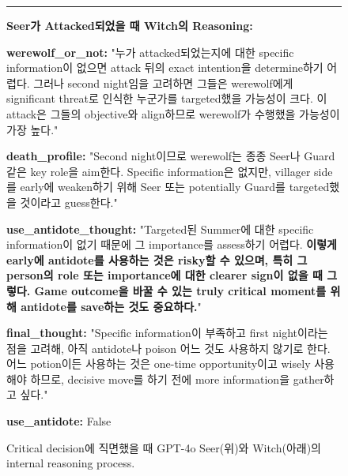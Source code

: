 \begin{figure}[htbp]
\begin{tcolorbox}[colback=blue!2!white, colframe=gray!50!blue]
\begin{minipage}{\linewidth}
\par\noindent\rule{\linewidth}{0.4pt}

\textbf{Seer가 Attacked되었을 때 Witch의 Reasoning:}

\textbf{werewolf\_or\_not:}
"누가 attacked되었는지에 대한 specific information이 없으면 attack 뒤의 exact intention을 determine하기 어렵다. 그러나 second night임을 고려하면 그들은 werewolf에게 significant threat로 인식한 누군가를 targeted했을 가능성이 크다. 이 attack은 그들의 objective와 align하므로 werewolf가 수행했을 가능성이 가장 높다."

\textbf{death\_profile:}
"Second night이므로 werewolf는 종종 Seer나 Guard 같은 key role을 aim한다. Specific information은 없지만, villager side를 early에 weaken하기 위해 Seer 또는 potentially Guard를 targeted했을 것이라고 guess한다."

\textbf{use\_antidote\_thought:}
"Targeted된 Summer에 대한 specific information이 없기 때문에 그 importance를 assess하기 어렵다. \textbf{이렇게 early에 antidote를 사용하는 것은 risky할 수 있으며, 특히 그 person의 role 또는 importance에 대한 clearer sign이 없을 때 그렇다. Game outcome을 바꿀 수 있는 truly critical moment를 위해 antidote를 save하는 것도 중요하다.}"


\textbf{final\_thought:}
"Specific information이 부족하고 first night이라는 점을 고려해, 아직 antidote나 poison 어느 것도 사용하지 않기로 한다. 어느 potion이든 사용하는 것은 one-time opportunity이고 wisely 사용해야 하므로, decisive move를 하기 전에 more information을 gather하고 싶다."

\textbf{use\_antidote:}
False

\end{minipage}
\end{tcolorbox}
\caption{Critical decision에 직면했을 때 GPT-4o Seer(위)와 Witch(아래)의 internal reasoning process.}
\label{fig:gpt4o-seer-witch-decision}
\end{figure}

